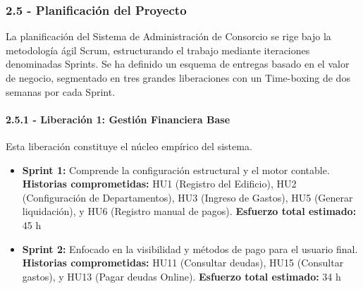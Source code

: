 \subsubsection{2.5 - Planificación del Proyecto}

La planificación del Sistema de Administración de Consorcio se rige bajo la metodología ágil Scrum, estructurando el trabajo mediante iteraciones denominadas Sprints. Se ha definido un esquema de entregas basado en el valor de negocio, segmentado en tres grandes liberaciones con un Time-boxing de dos semanas por cada Sprint.

\paragraph{2.5.1 - Liberación 1: Gestión Financiera Base}
Esta liberación constituye el núcleo empírico del sistema.
\begin{itemize}
    \item \textbf{Sprint 1:} Comprende la configuración estructural y el motor contable.  
    \textbf{Historias comprometidas:} HU1 (Registro del Edificio), HU2 (Configuración de Departamentos), HU3 (Ingreso de Gastos), HU5 (Generar liquidación), y HU6 (Registro manual de pagos).  
    \textbf{Esfuerzo total estimado:} 45 h
    
    \item \textbf{Sprint 2:} Enfocado en la visibilidad y métodos de pago para el usuario final.  
    \textbf{Historias comprometidas:} HU11 (Consultar deudas), HU15 (Consultar gastos), y HU13 (Pagar deudas Online).  
    \textbf{Esfuerzo total estimado:} 34 h
\end{itemize}
